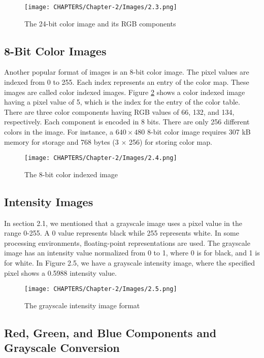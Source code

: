 \begin{figure}[H]
    \centering
    \texttt{[image: CHAPTERS/Chapter-2/Images/2.3.png]}
    \caption{The 24-bit color image and its RGB components}
    \label{fig:2.3}
\end{figure}

\subsection{8-Bit Color Images}
Another popular format of images is an 8-bit color image. The pixel values are indexed from 0 to 255. Each index represents an entry of the color map. These images are called color indexed images. Figure \ref{fig:2.4} shows a color indexed image having a pixel value of 5, which is the index for the entry of the color table. There are three color components having 
RGB values of 66, 132, and 134, respectively. 
Each component is encoded in 8 bits. There are 
only 256 different colors in the image. For instance, a
$640\times 480$ 8-bit color image requires 307 kB memory
for storage and 768 bytes (3 $\times$ 256) for storing
color map.

\begin{figure}[H]
    \centering
    \texttt{[image: CHAPTERS/Chapter-2/Images/2.4.png]}
    \caption{The 8-bit color indexed image}
    \label{fig:2.4}
\end{figure}

\subsection{Intensity Images}
In section 2.1, we mentioned that a grayscale image uses a 
pixel value in the range 0-255. A 0 value represents black while 255 
represents white. In some processing environments, floating-point representations are used. The grayscale image has an intensity value normalized from 0 to 1, where 0 is for black, and 1 is for white. In Figure 2.5, we have a grayscale intensity image, where the specified pixel shows a 0.5988 intensity value.
\begin{figure}[H]
    \centering
    \texttt{[image: CHAPTERS/Chapter-2/Images/2.5.png]}
    \caption{The grayscale intensity image format}
    \label{fig:2.5}
\end{figure}
\subsection{Red, Green, and Blue Components and Grayscale Conversion}

